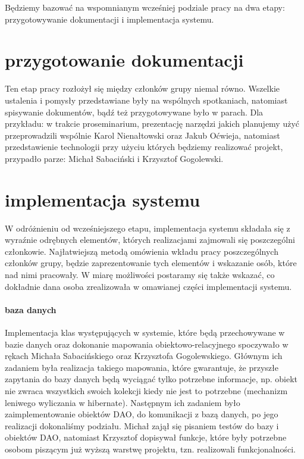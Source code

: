 \documentclass[licencjacka]{pracamgr}
\begin{document}
Będziemy bazować na wspomnianym wcześniej podziale pracy na dwa etapy: przygotowywanie dokumentacji i implementacja systemu.
\section{przygotowanie dokumentacji}
Ten etap pracy rozłożył się między członków grupy niemal równo. Wszelkie ustalenia i pomysły przedstawiane były na wspólnych spotkaniach,
natomiast spisywanie dokumentów, bądź też przygotowywane było w parach. Dla przykładu: w trakcie proseminarium, prezentację narzędzi jakich planujemy użyć
przeprowadzili wspólnie Karol Nienałtowski oraz Jakub Oćwieja, natomiast przedstawienie technologii przy użyciu których będziemy realizować projekt, przypadło parze: Michał Sabaciński i Krzysztof Gogolewski.

\section{implementacja systemu}
W odróżnieniu od wcześniejszego etapu, implementacja systemu składała się z wyraźnie odrębnych elementów, których realizacjami zajmowali
się poszczególni członkowie. Najłatwiejszą metodą omówienia wkładu pracy poszczególnych członków grupy,
będzie zaprezentowanie tych elementów i wskazanie osób, które nad nimi pracowały. W miarę możliwości postaramy się także wskazać,
co dokładnie dana osoba zrealizowała w omawianej części implementacji systemu.

\paragraph{baza danych}
Implementacja klas występujących w systemie, które będą przechowywane w bazie danych oraz dokonanie mapowania obiektowo-relacyjnego 
spoczywało w rękach Michała Sabacińskiego oraz Krzysztofa Gogolewskiego. Głównym ich zadaniem była realizacja takiego mapowania,
które gwarantuje, że przyszłe zapytania do bazy danych będą wyciągać tylko potrzebne informacje, np. obiekt nie zwraca wszystkich
swoich kolekcji kiedy nie jest to potrzebne (mechanizm leniwego wyliczania w hibernate). Następnym ich zadaniem było zaimplementowanie 
obiektów DAO, do komunikacji z bazą danych, po jego realizacji dokonaliśmy podziału. Michał zajął się pisaniem testów do bazy i obiektów DAO, 
natomiast Krzysztof dopisywał funkcje, które były potrzebne osobom piszącym już wyższą warstwę projektu, tzn. realizowali funkcjonalności.
\end{document}

